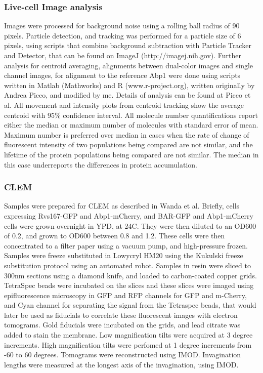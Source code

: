 \subsubsection{Live-cell Image analysis}
Images were processed for background noise using a rolling ball radius of 90 pixels. Particle detection, and tracking was performed for a particle size of 6 pixels, using scripts that combine background subtraction with Particle Tracker and Detector, that can be found on ImageJ (http://imagej.nih.gov). Further analysis for centroid averaging, alignments between dual-color images and single channel images, for alignment to the reference Abp1 were done using scripts written in Matlab (Mathworks) and R (www.r-project.org), written originally by Andrea Picco, and modified by me. Details of analysis can be found at Picco et al. All movement and intensity plots from centroid tracking show the average centroid with 95\% confidence interval. All molecule number quantifications report either the median or maximum number of molecules with standard error of mean. Maximum number is preferred over median in cases when the rate of change of fluorescent intensity of two populations being compared are not similar, and the lifetime of the protein populations being compared are not similar. The median in this case underreports the differences in protein accumulation. 


\subsubsection{CLEM}
Samples were prepared for CLEM as described in Wanda et al. Briefly, cells expressing Rvs167-GFP and Abp1-mCherry, and BAR-GFP and Abp1-mCherry cells were grown overnight in YPD, at 24C. They were then diluted to an OD600 of 0.2, and grown to OD600 between 0.8 and 1.2. These cells were then concentrated to a filter paper using a vacuum pump, and high-pressure frozen. Samples were freeze substituted in Lowycryl HM20 using the Kukulski freeze substitution protocol using an automated robot. 
\vspace{2mm}
Samples in resin were sliced to 300nm sections using a diamond knife, and loaded to carbon-coated copper grids. TetraSpec beads were incubated on the slices and these slices were imaged using epifluorescence microscopy in GFP and RFP channels for GFP and m-Cherry, and Cyan channel for separating the signal from the Tetraspec beads, that would later be used as fiducials to correlate these fluorescent images with electron tomograms. 
\vspace{2mm}
Gold fiducials were incubated on the grids, and lead citrate was added to stain the membrane. Low magnification tilts were acquired at 3 degree increments. High magnification tilts were perfomed at 1 degree increments from -60 to 60 degrees. Tomograms were reconstructed using IMOD. Invagination lengths were measured at the longest axis of the invagination, using IMOD.



